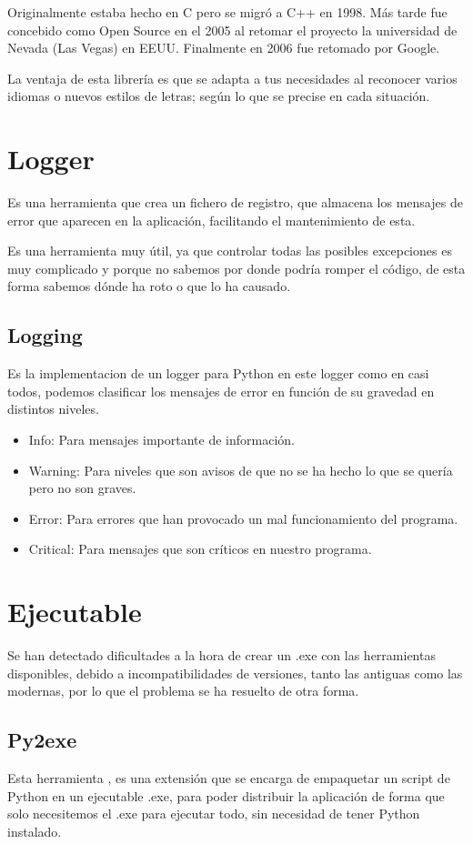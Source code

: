 Originalmente estaba hecho en C pero se migró a C++ en 1998. Más tarde fue concebido como Open Source en el 2005 al retomar el proyecto la universidad de Nevada (Las Vegas) en EEUU. Finalmente en 2006 fue retomado por Google.

La ventaja de esta librería es que se adapta a tus necesidades al reconocer varios idiomas o nuevos estilos de letras; según lo que se precise en cada situación. 

\section{Logger}
Es una herramienta que crea un fichero de registro, que almacena los mensajes de error que aparecen en la aplicación, facilitando el mantenimiento de esta.

Es una herramienta muy útil, ya que controlar todas las posibles excepciones es muy complicado y porque no sabemos por donde podría romper el código, de esta forma sabemos dónde ha roto o que lo ha causado.

\subsection{Logging}
Es la implementacion de un logger para Python \cite{python:logger} en este logger como en casi todos, podemos clasificar los mensajes de error en función de su gravedad en distintos niveles.

\begin{itemize}
\item Info: Para mensajes importante de información.
\item Warning: Para niveles que son avisos de que no se ha hecho lo que se quería pero no son graves.
\item Error: Para errores que han provocado un mal funcionamiento del programa.
\item Critical: Para mensajes que son críticos en nuestro programa.
\end{itemize}

\section{Ejecutable}
Se han detectado  dificultades a la hora de crear un .exe con las herramientas disponibles, debido a incompatibilidades de versiones, tanto las antiguas como las modernas, por lo que el problema se ha resuelto de otra forma.

\subsection{Py2exe}
Esta herramienta \cite{p2exe}, es una extensión que se encarga de empaquetar un script de Python en un ejecutable .exe, para poder distribuir la aplicación de forma que solo necesitemos el .exe para ejecutar todo, sin necesidad de tener Python instalado.

